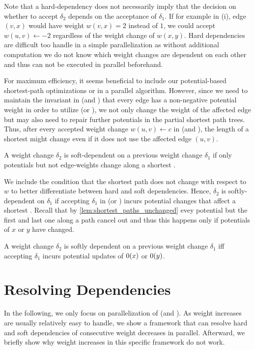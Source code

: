 Note that a hard-dependency does not necessarily imply that the decision on whether to accept $\delta_2$ depends on the acceptance of $\delta_1$.
If for example in (i), edge $(v, x)$ would have weight $w(v, x) = 2$ instead of $1$, we could accept $w(u, v) \gets -2$ regardless of the weight change of $w(x, y)$.
Hard dependencies are difficult too handle in a simple parallelization as without additional computation we do not know which weight changes are dependent on each other and thus can not be executed in parallel beforehand.

For maximum efficiency, it seems beneficial to include our potential-based shortest-path optimizations \algsp or \algbp in a parallel algorithm.
However, since we need to maintain the invariant in \algsp (and \algbp) that every edge has a non-negative potential weight in order to utilize \algdk (or \algbd), we not only change the weight of the affected edge but may also need to repair further potentials in the partial shortest path trees.
Thus, after every accepted weight change $w(u, v) \gets c$ in \algsp (and \algbp), the length of a shortest  might change even if it does not use the affected edge $(u, v)$.

\begin{definition}    
    A weight change $\delta_2$ is soft-dependent on a previous weight change $\delta_1$ if only potentials but not edge-weights change along a shortest .
\end{definition}

\noindent We include the condition that the shortest path does not change with respect to $w$ to better differentiate between hard and soft dependencies.
Hence, $\delta_2$ is softly-dependent on $\delta_1$ if accepting $\delta_1$ in \algsp (or \algbp) incurs potential changes that affect a shortest .
Recall that by \cref{lem:shortest_paths_unchanged} evey potential but the first and last one along a path cancel out and thus this happens only if potentials of $x$ or $y$ have changed.
\begin{corollary}
    A weight change $\delta_2$ is softly dependent on a previous weight change $\delta_1$ iff accepting $\delta_1$ incurs potential updates of $\pot(x)$ or $\pot(y)$.
\end{corollary}


\section{Resolving Dependencies}
In the following, we only focus on parallelization of \algsp (and \algbp).
As weight increases are usually relatively easy to handle, we show a framework that can resolve hard and soft dependencies of consecutive weight decreases in parallel.
Afterward, we briefly show why weight increases in this specific framework do not work.

